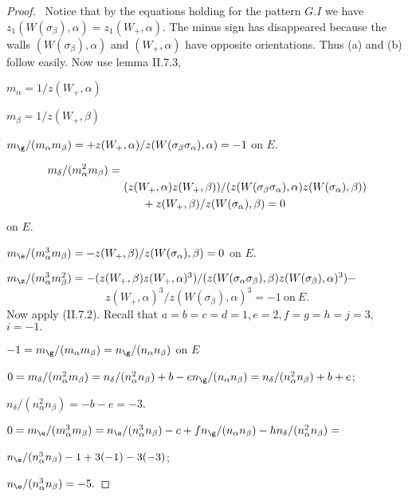 \documentclass{memo-l}
\theoremstyle{definition}
\theoremstyle{remark}
\numberwithin{section}{chapter}
\numberwithin{equation}{chapter}
\begin{document}
\begin{proof} \   Notice that by the equations holding for the pattern $G.I$ we
have $z_{1}(W({\sigma}_{\beta}),{\alpha}) = z_{1}(W_{+},{\alpha})$.
 The minus sign has disappeared because the walls $(W({\sigma}_{\beta}),
{\alpha})$ and $(W_{+},{\alpha})$ have opposite orientations.
 Thus (a) and (b) follow easily.  Now use lemma II.7.3,

\noindent
$m_{\alpha} = 1/z(W_{+},{\alpha})$

\noindent
$m_{\beta} = 1/z(W_{+},{\beta})$

\noindent
$m_{{\g}}/(m_{\alpha}m_{\beta}) = +z(W_{+},
{\alpha})/z(W({\sigma}_{\beta}{\sigma}_{\alpha}),{\alpha}) = -1$ on $E$.

$$\aligned
m_{{\delta}}/(m_{\alpha}^{2}m_{\beta}) =& \\
&\ (z(W_{+},{\alpha})z(W_{+},{\beta}))/(z(W({\sigma}_{\beta}{\sigma}_{\alpha}),
{\alpha})z(W({\sigma}_{\alpha}),{\beta})) \\
&\quad\quad  +
z(W_{+},{\beta})/z(W({\sigma}_{\alpha}),{\beta}) = 0
\endaligned $$ on $E$.

\noindent
$m_{{\e}}/(m_{\alpha}^{3}m_{\beta}) =
-z(W_{+},{\beta})/z(W({\sigma}_{\alpha}),{\beta}) = 0$ on $E$.

\noindent
$m_{{\z}}/(m_{\alpha}^{3}m_{\beta}^{2}) =
-(z(W_{+},{\beta})z(W_{+},{\alpha})^{3})/(z(W({\sigma}_{\alpha}
{\sigma}_{\beta}),{\beta})z(W({\sigma}_{\beta}),{\alpha})^{3}) - $
$$
z(W_{+},{\alpha})^{3}/z(W({\sigma}_{\beta}),{\alpha})^{3} = -1\
{\text{on}}\  E	.
$$
Now apply (II.7.2).  Recall that $a = b = c = d = 1, e = 2, f = g = h = j = 3,$
$i=-1.$

\noindent
$-1 =   m_{{\g}}/(m_{\alpha}m_{\beta}) =
n_{{\g}}/(n_{\alpha}n_{\beta})$ on $E$

\noindent
$0 = m_{{\delta}}/(m_{\alpha}^{2}m_{\beta}) =
n_{{\delta}}/(n_{\alpha}^{2}n_{\beta}) +
b -en_{{\g}}/(n_{\alpha}n_{\beta}) =
n_{{\delta}}/(n_{\alpha}^{2}n_{\beta}) + b + e$;

   $n_{{\delta}}/(n_{\alpha}^{2}n_{\beta}) = -b -e = -3$.

\noindent
$0 = m_{{\e}}/(m_{\alpha}^{3}m_{\beta}) =
n_{{\e}}/(n_{\alpha}^{3}n_{\beta}) - c +
fn_{{\g}}/(n_{\alpha}n_{\beta}) - hn_{{\delta}}/(n_{\alpha}^{2}
n_{\beta}) =$

$n_{{\e}}/(n_{\alpha}^{3}n_{\beta}) -1 + 3(-1) - 3(-3)$;

$n_{{\e}}/(n_{\alpha}^{3}n_{\beta}) = -5.$

\medskip


\end{proof}
\end{document}
